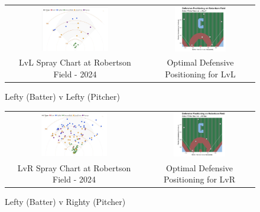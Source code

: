 \documentclass{article}
\begin{document}
\newpage
\begin{figure}[h]
    \centering
    \begin{tabular}{cc}  
        \includegraphics[width=0.5\textwidth]{images/spray24_lvl.png} & 
        \includegraphics[width=0.5\textwidth]{images/optimal_lvl.png} \\
         LvL Spray Chart at Robertson Field - 2024 & Optimal Defensive Positioning for LvL
    \end{tabular}
    \caption{Lefty (Batter) v Lefty (Pitcher)}
    \label{fig:leftyvleftycomp}
    \cite{trackman2024}
\end{figure}
\vspace{.5cm}
\begin{figure}[h]
    \centering
    \begin{tabular}{cc}  
        \includegraphics[width=0.5\textwidth]{images/spray24_lvr.png} & 
        \includegraphics[width=0.5\textwidth]{images/optimal_lvr.png} \\
         LvR Spray Chart at Robertson Field - 2024 & Optimal Defensive Positioning for LvR
    \end{tabular}
    \caption{Lefty (Batter) v Righty (Pitcher)}
    \label{fig:leftyvrightycomp}
    \cite{trackman2024}
\end{figure}
\end{document}
